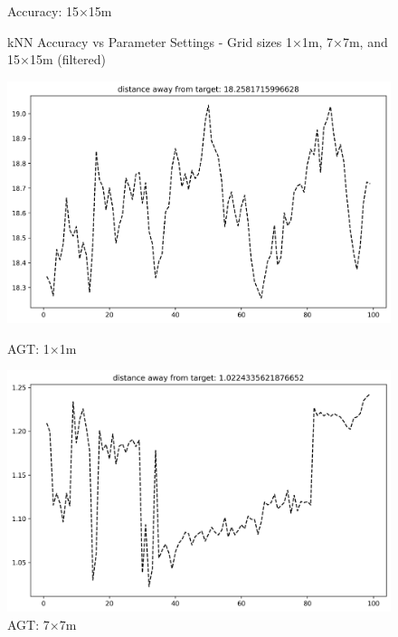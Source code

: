 \documentclass[runningheads]{llncs}
\begin{document}
\begin{figure}[H]
\begin{minipage}{0.32\textwidth}
		\caption*{Accuracy: 15×15m}
	\end{minipage}
	\caption{kNN Accuracy vs Parameter Settings - Grid sizes 1×1m, 7×7m, and 15×15m (filtered)}
\end{figure}

\begin{figure}[H]
	\centering
	\begin{minipage}{0.32\textwidth}
		\centering
		\includegraphics[width=\textwidth]{figures/knn_custom_1.png}
		\caption*{AGT: 1×1m}
	\end{minipage}
	\hfill
	\begin{minipage}{0.32\textwidth}
		\centering
		\includegraphics[width=\textwidth]{figures/knn_custom_7.png}
		\caption*{AGT: 7×7m}
	\end{minipage}
	\hfill
	\begin{minipage}{0.32\textwidth}
		\centering

\end{minipage}
\end{figure}
\end{document}
